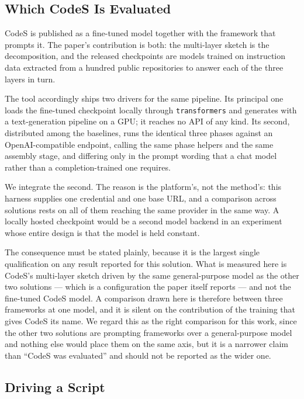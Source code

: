\subsection{Which CodeS Is Evaluated}

CodeS is published as a fine-tuned model together with the framework that
prompts it. The paper's contribution is both: the multi-layer sketch is the
decomposition, and the released checkpoints are models trained on instruction
data extracted from a hundred public repositories to answer each of the three
layers in turn.

The tool accordingly ships two drivers for the same pipeline. Its principal one
loads the fine-tuned checkpoint locally through \texttt{transformers} and
generates with a text-generation pipeline on a GPU; it reaches no API of any
kind. Its second, distributed among the baselines, runs the identical three
phases against an OpenAI-compatible endpoint, calling the same phase helpers
and the same assembly stage, and differing only in the prompt wording that a
chat model rather than a completion-trained one requires.

We integrate the second. The reason is the platform's, not the method's: this
harness supplies one credential and one base URL, and a comparison across
solutions rests on all of them reaching the same provider in the same way. A
locally hosted checkpoint would be a second model backend in an experiment
whose entire design is that the model is held constant.

The consequence must be stated plainly, because it is the largest single
qualification on any result reported for this solution. What is measured here
is CodeS's multi-layer sketch driven by the same general-purpose model as the
other two solutions --- which is a configuration the paper itself reports ---
and not the fine-tuned CodeS model. A comparison drawn here is therefore
between three frameworks at one model, and it is silent on the contribution of
the training that gives CodeS its name. We regard this as the right comparison
for this work, since the other two solutions are prompting frameworks over a
general-purpose model and nothing else would place them on the same axis, but
it is a narrower claim than ``CodeS was evaluated'' and should not be reported
as the wider one.

\subsection{Driving a Script}

